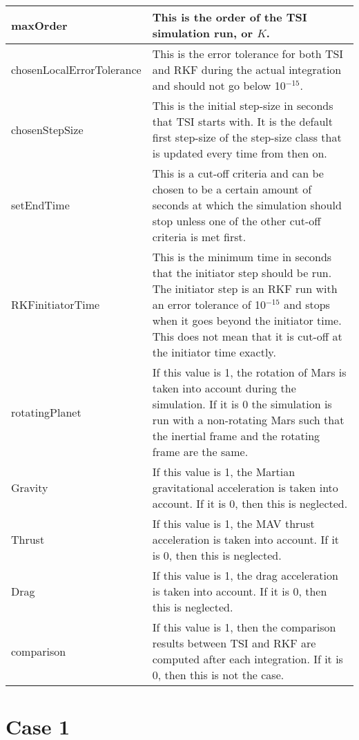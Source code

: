 \begin{longtable}{|l|p{10cm}|}
maxOrder & This is the order of the \ac{TSI} simulation run, or $K$. \\ \hline
chosenLocalErrorTolerance & This is the error tolerance for both \ac{TSI} and \ac{RKF} during the actual integration and should not go below 10$^{-15}$. \\ \hline
chosenStepSize & This is the initial step-size in seconds that \ac{TSI} starts with. It is the default first step-size of the step-size class that is updated every time from then on. \\ \hline
setEndTime & This is a cut-off criteria and can be chosen to be a certain amount of seconds at which the simulation should stop unless one of the other cut-off criteria is met first. \\ \hline
RKFinitiatorTime & This is the minimum time in seconds that the initiator step should be run. The initiator step is an \ac{RKF} run with an error tolerance of 10$^{-15}$ and stops when it goes beyond the initiator time. This does not mean that it is cut-off at the initiator time exactly. \\ \hline
rotatingPlanet & If this value is 1, the rotation of Mars is taken into account during the simulation. If it is 0 the simulation is run with a non-rotating Mars such that the inertial frame and the rotating frame are the same. \\ \hline
Gravity & If this value is 1, the Martian gravitational acceleration is taken into account. If it is 0, then this is neglected. \\ \hline
Thrust & If this value is 1, the \ac{MAV} thrust acceleration is taken into account. If it is 0, then this is neglected. \\ \hline
Drag & If this value is 1, the drag acceleration is taken into account. If it is 0, then this is neglected. \\ \hline
comparison & If this value is 1, then the comparison results between \ac{TSI} and \ac{RKF} are computed after each integration. If it is 0, then this is not the case. \\ \hline

\end{longtable}
 


\section{Case 1}
\label{sec:case1}

